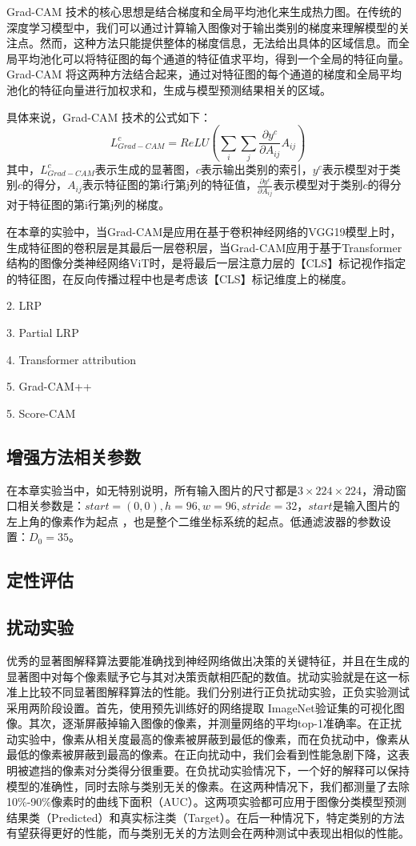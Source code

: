 Grad-CAM 技术的核心思想是结合梯度和全局平均池化来生成热力图。在传统的深度学习模型中，我们可以通过计算输入图像对于输出类别的梯度来理解模型的关注点。然而，这种方法只能提供整体的梯度信息，无法给出具体的区域信息。而全局平均池化可以将特征图的每个通道的特征值求平均，得到一个全局的特征向量。Grad-CAM 将这两种方法结合起来，通过对特征图的每个通道的梯度和全局平均池化的特征向量进行加权求和，生成与模型预测结果相关的区域。

具体来说，Grad-CAM 技术的公式如下：
\begin{equation}
L_{Grad-CAM}^{c} = ReLU(\sum_{i}\sum_{j}\frac{\partial y^c}{\partial A_{ij}}A_{ij})
\end{equation}
其中，$L_{Grad-CAM}^{c}$表示生成的显著图，$c$表示输出类别的索引，$y^c$表示模型对于类别$c$的得分，$A_{ij}$表示特征图的第i行第j列的特征值，$\frac{\partial y^c}{\partial A_{ij}}$表示模型对于类别$c$的得分对于特征图的第i行第j列的梯度。

在本章的实验中，当Grad-CAM是应用在基于卷积神经网络的VGG19模型上时，生成特征图的卷积层是其最后一层卷积层，当Grad-CAM应用于基于Transformer结构的图像分类神经网络ViT时，是将最后一层注意力层的【CLS】标记视作指定的特征图，在反向传播过程中也是考虑该【CLS】标记维度上的梯度。


2. LRP

3. Partial LRP

4. Transformer attribution

5. Grad-CAM++

5. Score-CAM


\subsection{增强方法相关参数}
在本章实验当中，如无特别说明，所有输入图片的尺寸都是$3\times224\times224$，滑动窗口相关参数是：$start=(0,0), h=96, w=96, stride=32$，$start$是输入图片的左上角的像素作为起点 ，也是整个二维坐标系统的起点。低通滤波器的参数设置：$D_0=35$。


\subsection{定性评估}

\subsection{扰动实验}
优秀的显著图解释算法要能准确找到神经网络做出决策的关键特征，并且在生成的显著图中对每个像素赋予它与其对决策贡献相匹配的数值。扰动实验就是在这一标准上比较不同显著图解释算法的性能。我们分别进行正负扰动实验，正负实验测试采用两阶段设置。首先，使用预先训练好的网络提取 ImageNet验证集的可视化图像。其次，逐渐屏蔽掉输入图像的像素，并测量网络的平均top-1准确率。在正扰动实验中，像素从相关度最高的像素被屏蔽到最低的像素，而在负扰动中，像素从最低的像素被屏蔽到最高的像素。在正向扰动中，我们会看到性能急剧下降，这表明被遮挡的像素对分类得分很重要。在负扰动实验情况下，一个好的解释可以保持模型的准确性，同时去除与类别无关的像素。在这两种情况下，我们都测量了去除10\%-90\%像素时的曲线下面积（AUC）。这两项实验都可应用于图像分类模型预测结果类（Predicted）和真实标注类（Target）。在后一种情况下，特定类别的方法有望获得更好的性能，而与类别无关的方法则会在两种测试中表现出相似的性能。

